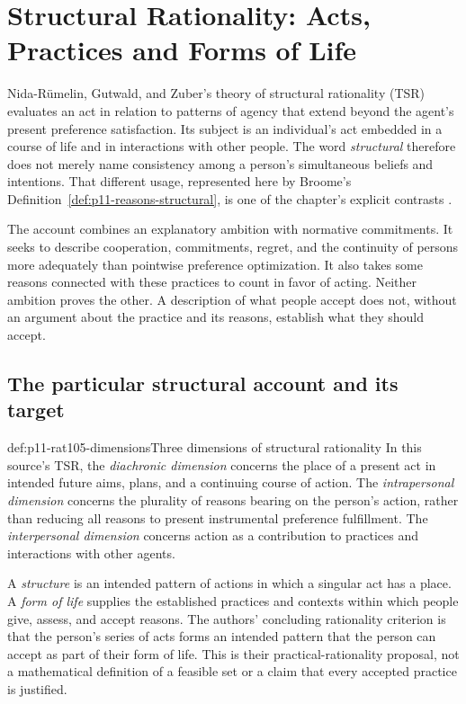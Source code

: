 \chapter{Structural Rationality: Acts, Practices and Forms of Life}
\label{sec:p11-rationality-10-5}

Nida-R\"umelin, Gutwald, and Zuber's theory of structural rationality
(TSR) evaluates an act in relation to patterns of agency that extend
beyond the agent's present preference satisfaction. Its subject is an
individual's act embedded in a course of life and in interactions with
other people. The word \emph{structural} therefore does not merely name
consistency among a person's simultaneous beliefs and intentions. That
different usage, represented here by Broome's
Definition~\ref{def:p11-reasons-structural}, is one of the chapter's
explicit contrasts \parencite[pp.~625 and 628--629]{NidaRumelinGutwaldZuber2021}.

The account combines an explanatory ambition with normative commitments.
It seeks to describe cooperation, commitments, regret, and the continuity
of persons more adequately than pointwise preference optimization. It
also takes some reasons connected with these practices to count in favor
of acting. Neither ambition proves the other. A description of what people
accept does not, without an argument about the practice and its reasons,
establish what they should accept.

\section{The particular structural account and its target}
\label{sec:p11-rat105-account}

\begin{hbdefinition}{def:p11-rat105-dimensions}{Three dimensions of structural rationality}
In this source's TSR, the \emph{diachronic dimension} concerns the place
of a present act in intended future aims, plans, and a continuing course
of action. The \emph{intrapersonal dimension} concerns the plurality of
reasons bearing on the person's action, rather than reducing all reasons
to present instrumental preference fulfillment. The \emph{interpersonal
dimension} concerns action as a contribution to practices and interactions
with other agents.

A \emph{structure} is an intended pattern of actions in which a singular
act has a place. A \emph{form of life} supplies the established practices
and contexts within which people give, assess, and accept reasons. The
authors' concluding rationality criterion is that the person's series of
acts forms an intended pattern that the person can accept as part of
their form of life. This is their practical-rationality proposal, not a
mathematical definition of a feasible set or a claim that every accepted
practice is justified.
\end{hbdefinition}

